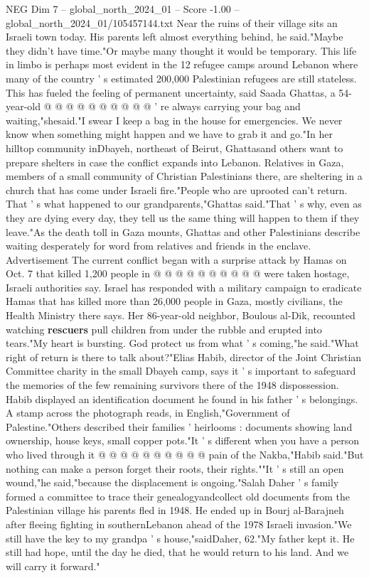 \begin{textsample}{NEG Dim 7 – global\_north\_2024\_01 – Score -1.00 – global\_north\_2024\_01/105457144.txt}
Near the ruins of their village sits an Israeli town today.
His parents left almost everything behind, he said."Maybe they didn't have time."Or maybe many thought it would be temporary.
This life in limbo is perhaps most evident in the 12 refugee camps around Lebanon where many of the country ' s estimated 200,000 Palestinian refugees are still stateless.
This has fueled the feeling of permanent uncertainty, said Saada Ghattas, a 54-year-old @ @ @ @ @ @ @ @ @ @ ' re always carrying your bag and waiting,"shesaid."I swear I keep a bag in the house for emergencies.
We never know when something might happen and we have to grab it and go."In her hilltop community inDbayeh, northeast of Beirut, Ghattasand others want to prepare shelters in case the conflict expands into Lebanon.
Relatives in Gaza, members of a small community of Christian Palestinians there, are sheltering in a church that has come under Israeli fire."People who are uprooted can't return.
That ' s what happened to our grandparents,"Ghattas said."That ' s why, even as they are dying every day, they tell us the same thing will happen to them if they leave."As the death toll in Gaza mounts, Ghattas and other Palestinians describe waiting desperately for word from relatives and friends in the enclave.
Advertisement The current conflict began with a surprise attack by Hamas on Oct. 7 that killed 1,200 people in @ @ @ @ @ @ @ @ @ @ were taken hostage, Israeli authorities say.
Israel has responded with a military campaign to eradicate Hamas that has killed more than 26,000 people in Gaza, mostly civilians, the Health Ministry there says.
Her 86-year-old neighbor, Boulous al-Dik, recounted watching \textbf{rescuers} pull children from under the rubble and erupted into tears."My heart is bursting.
God protect us from what ' s coming,"he said."What right of return is there to talk about?"Elias Habib, director of the Joint Christian Committee charity in the small Dbayeh camp, says it ' s important to safeguard the memories of the few remaining survivors there of the 1948 dispossession.
Habib displayed an identification document he found in his father ' s belongings.
A stamp across the photograph reads, in English,"Government of Palestine."Others described their families ' heirlooms : documents showing land ownership, house keys, small copper pots."It ' s different when you have a person who lived through it @ @ @ @ @ @ @ @ @ @ pain of the Nakba,"Habib said."But nothing can make a person forget their roots, their rights.""It ' s still an open wound,"he said,"because the displacement is ongoing."Salah Daher ' s family formed a committee to trace their genealogyandcollect old documents from the Palestinian village his parents fled in 1948.
He ended up in Bourj al-Barajneh after fleeing fighting in southernLebanon ahead of the 1978 Israeli invasion."We still have the key to my grandpa ' s house,"saidDaher, 62."My father kept it.
He still had hope, until the day he died, that he would return to his land.
And we will carry it forward."

\end{textsample}
